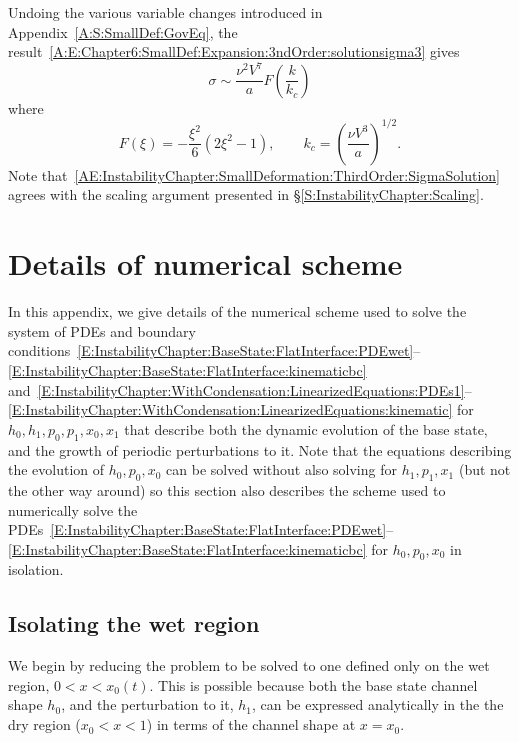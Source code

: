 \begin{subappendices}
Undoing the various variable changes introduced in Appendix~\ref{A:S:SmallDef:GovEq}, the result~\eqref{A:E:Chapter6:SmallDef:Expansion:3ndOrder:solutionsigma3} gives
\begin{equation}\label{AE:InstabilityChapter:SmallDeformation:ThirdOrder:SigmaSolution}
\sigma\sim \frac{\nu^2 V^7}{a}F\left(\frac{k}{k_c}\right)
\end{equation}
where
\begin{equation}\label{AE:InstabilityChapter:SmallDeformation:ThirdOrder:SigmaSolutionParticulars}
F(\xi) = -\frac{\xi^2}{6}\left(2\xi^2 -1\right), \qquad k_c = \left(\frac{\nu V^3}{a}\right)^{1/2}.
\end{equation}
Note that~\eqref{AE:InstabilityChapter:SmallDeformation:ThirdOrder:SigmaSolution} agrees with the scaling argument presented in \S\ref{S:InstabilityChapter:Scaling}.

\section{Details of numerical scheme}\label{A:Chapter6:Numerics}
In this appendix, we give details of the numerical scheme used to solve the system of PDEs and boundary conditions~\eqref{E:InstabilityChapter:BaseState:FlatInterface:PDEwet}--\eqref{E:InstabilityChapter:BaseState:FlatInterface:kinematicbc} and~\eqref{E:InstabilityChapter:WithCondensation:LinearizedEquations:PDEs1}--\eqref{E:InstabilityChapter:WithCondensation:LinearizedEquations:kinematic} for $h_0, h_1, p_0,p_1, x_0, x_1$ that describe both the dynamic evolution of the base state, and the growth of periodic perturbations to it. Note that the equations describing the evolution of $h_0, p_0,x_0$ can be solved without also solving for $h_1, p_1,x_1$ (but not the other way around) so this section also describes the scheme used to numerically solve the PDEs~\eqref{E:InstabilityChapter:BaseState:FlatInterface:PDEwet}--\eqref{E:InstabilityChapter:BaseState:FlatInterface:kinematicbc} for $h_0, p_0,x_0$ in isolation.

\subsection{Isolating the wet region}
We begin by reducing the problem to be solved to one defined only on the wet region, $0 < x < x_0(t)$. This is possible because both the base state channel shape $h_0$, and the perturbation to it, $h_1$, can be expressed analytically in the the dry region ($x_0 < x < 1$) in terms of the channel shape at $x = x_0$.


\end{subappendices}
